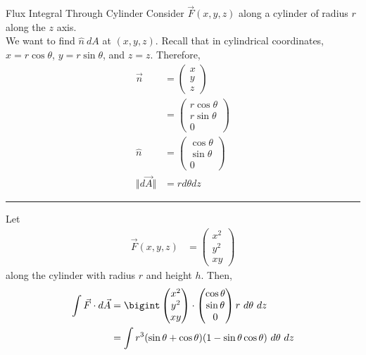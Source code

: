\documentclass[8pt]{extarticle}
\begin{document}
  \begin{problem}{Flux Integral Through Cylinder}
    Consider $\vec{F}(x,y,z)$ along a cylinder of radius $r$ along the $z$ axis.\\

    We want to find $\hat{n}~dA$ at $(x,y,z)$. Recall that in cylindrical coordinates, $x = r\cos\theta$, $y = r\sin\theta$, and $z = z$. Therefore,
    \begin{align*}
      \vec{n} &= \begin{pmatrix}x\\y\\z\end{pmatrix}\\
              &= \begin{pmatrix}r\cos\theta\\r\sin\theta\\0\end{pmatrix}\\
      \hat{n} &= \begin{pmatrix}\cos\theta\\\sin\theta\\0\end{pmatrix}\\
      \Vert d\vec{A}\Vert &= r d\theta dz
    \end{align*}
    \vspace{4pt}
    \rule{\textwidth}{0.4pt}
    \vspace{4pt}
    Let
    \begin{align*}
      \vec{F}(x,y,z) &= \begin{pmatrix}x^2\\y^2\\xy\end{pmatrix}
    \end{align*}
    along the cylinder with radius $r$ and height $h$. Then,
    \begin{align*}
      \int \vec{F}\cdot d\vec{A} &= \bigint \begin{pmatrix}x^2\\y^2\\xy\end{pmatrix}\cdot \begin{pmatrix}\cos\theta \\ \sin\theta \\ 0\end{pmatrix} r~d\theta~dz\\
                                 &= \int r^3(\sin\theta + \cos\theta)(1-\sin\theta\cos\theta)~d\theta~dz\\

\end{align*}
\end{problem}
\end{document}
